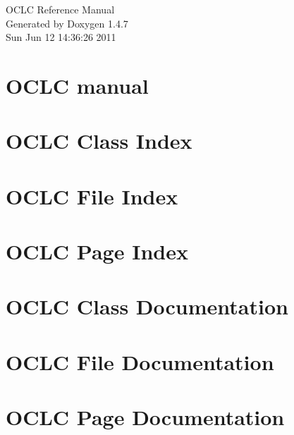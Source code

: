 \documentclass[a4paper]{book}
\begin{document}
\begin{titlepage}
\vspace*{7cm}
\begin{center}
{\Large OCLC Reference Manual}\\
\vspace*{1cm}
{\large Generated by Doxygen 1.4.7}\\
\vspace*{0.5cm}
{\small Sun Jun 12 14:36:26 2011}\\
\end{center}
\end{titlepage}
\clearemptydoublepage
{}
\tableofcontents
\clearemptydoublepage
{}
\chapter{OCLC manual }
\label{index}
\chapter{OCLC Class Index}

\chapter{OCLC File Index}

\chapter{OCLC Page Index}

\chapter{OCLC Class Documentation}



\chapter{OCLC File Documentation}

\chapter{OCLC Page Documentation}

\printindex
\end{document}

